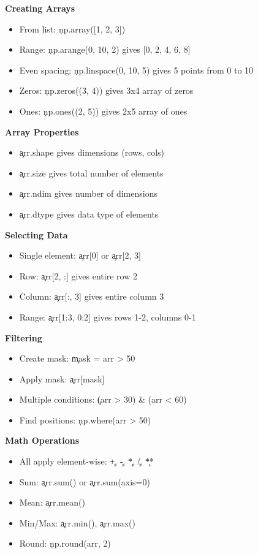 \begin{tcolorbox}[
    title=NumPy Essentials for Architects,
    colframe=gray,
    colback = white,
    arc=2mm
]
\textbf{Creating Arrays}
\begin{itemize}
\item From list: \c{np.array([1, 2, 3])}
\item Range: \c{np.arange(0, 10, 2)} gives [0, 2, 4, 6, 8]
\item Even spacing: \c{np.linspace(0, 10, 5)} gives 5 points from 0 to 10
\item Zeros: \c{np.zeros((3, 4))} gives 3x4 array of zeros
\item Ones: \c{np.ones((2, 5))} gives 2x5 array of ones
\end{itemize}

\textbf{Array Properties}
\begin{itemize}
\item \c{arr.shape} gives dimensions (rows, cols)
\item \c{arr.size} gives total number of elements
\item \c{arr.ndim} gives number of dimensions
\item \c{arr.dtype} gives data type of elements
\end{itemize}

\textbf{Selecting Data}
\begin{itemize}
\item Single element: \c{arr[0]} or \c{arr[2, 3]}
\item Row: \c{arr[2, :]} gives entire row 2
\item Column: \c{arr[:, 3]} gives entire column 3
\item Range: \c{arr[1:3, 0:2]} gives rows 1-2, columns 0-1
\end{itemize}

\textbf{Filtering}
\begin{itemize}
\item Create mask: \c{mask = arr > 50}
\item Apply mask: \c{arr[mask]}
\item Multiple conditions: \c{(arr > 30) \& (arr < 60)}
\item Find positions: \c{np.where(arr > 50)}
\end{itemize}

\textbf{Math Operations}
\begin{itemize}
\item All apply element-wise: \c{+}, \c{-}, \c{*}, \c{/}, \c{**}
\item Sum: \c{arr.sum()} or \c{arr.sum(axis=0)}
\item Mean: \c{arr.mean()}
\item Min/Max: \c{arr.min()}, \c{arr.max()}
\item Round: \c{np.round(arr, 2)}
\end{itemize}


\end{tcolorbox}
